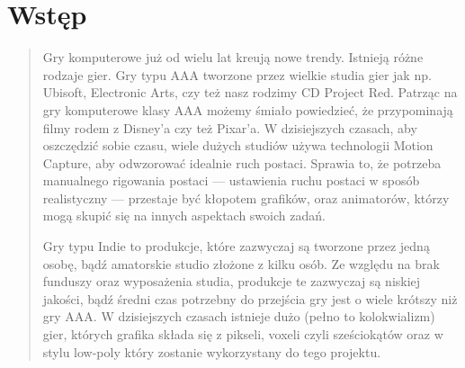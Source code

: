 \chapter*{Wstęp}
\begin{quotation}
\indent Gry komputerowe już od wielu lat kreują nowe trendy. Istnieją różne rodzaje gier.
Gry typu AAA tworzone przez wielkie studia gier jak np. Ubisoft, Electronic Arts, czy też nasz rodzimy CD Project Red. 
Patrząc na gry komputerowe klasy AAA możemy śmiało powiedzieć, że przypominają filmy rodem z Disney'a czy też Pixar'a. 
W dzisiejszych czasach, aby oszczędzić sobie czasu, wiele dużych studiów używa technologii Motion Capture, aby odwzorować idealnie ruch postaci. Sprawia to,
że potrzeba manualnego rigowania postaci --- ustawienia ruchu postaci w sposób realistyczny --- przestaje być kłopotem grafików, oraz animatorów, którzy mogą skupić się na innych aspektach swoich zadań.

\indent Gry typu Indie to produkcje, które zazwyczaj są tworzone przez jedną osobę, bądź amatorskie studio złożone z kilku osób. Ze względu na brak funduszy oraz wyposażenia studia, produkcje te zazwyczaj są niskiej jakości, bądź średni czas potrzebny do przejścia gry jest o wiele krótszy niż gry AAA.
W dzisiejszych czasach istnieje dużo (pełno to kolokwializm) gier, których grafika składa się z pikseli, voxeli czyli sześciokątów oraz w stylu low-poly który zostanie wykorzystany do tego projektu.

\newpage 
\end{quotation}

